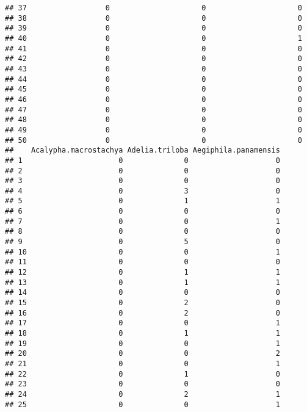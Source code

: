 \documentclass[
]{article}
\begin{document}
\begin{verbatim}
## 37                  0                     0                     0
## 38                  0                     0                     0
## 39                  0                     0                     0
## 40                  0                     0                     1
## 41                  0                     0                     0
## 42                  0                     0                     0
## 43                  0                     0                     0
## 44                  0                     0                     0
## 45                  0                     0                     0
## 46                  0                     0                     0
## 47                  0                     0                     0
## 48                  0                     0                     0
## 49                  0                     0                     0
## 50                  0                     0                     0
##    Acalypha.macrostachya Adelia.triloba Aegiphila.panamensis
## 1                      0              0                    0
## 2                      0              0                    0
## 3                      0              0                    0
## 4                      0              3                    0
## 5                      0              1                    1
## 6                      0              0                    0
## 7                      0              0                    1
## 8                      0              0                    0
## 9                      0              5                    0
## 10                     0              0                    1
## 11                     0              0                    0
## 12                     0              1                    1
## 13                     0              1                    1
## 14                     0              0                    0
## 15                     0              2                    0
## 16                     0              2                    0
## 17                     0              0                    1
## 18                     0              1                    1
## 19                     0              0                    1
## 20                     0              0                    2
## 21                     0              0                    1
## 22                     0              1                    0
## 23                     0              0                    0
## 24                     0              2                    1
## 25                     0              0                    1

\end{verbatim}
\end{document}
